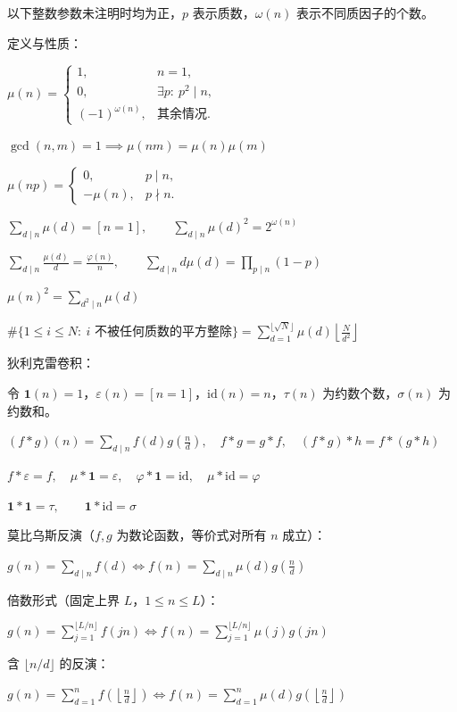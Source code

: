 以下整数参数未注明时均为正，$p$ 表示质数，$\omega(n)$ 表示不同质因子的个数。

定义与性质：\nopagebreak[4]

$\mu(n)=\begin{cases}1,&n=1,\\0,&\exists p:\ p^2\mid n,\\(-1)^{\omega(n)},&\text{其余情况}.\end{cases}$

$\gcd(n,m)=1\implies\mu(nm)=\mu(n)\mu(m)$

$\mu(np)=\begin{cases}0,&p\mid n,\\-\mu(n),&p\nmid n.\end{cases}$

$\displaystyle\sum_{d\mid n}\mu(d)=[n=1],\qquad\sum_{d\mid n}\mu(d)^2=2^{\omega(n)}$

$\displaystyle\sum_{d\mid n}\frac{\mu(d)}d=\frac{\varphi(n)}n,\qquad\sum_{d\mid n}d\mu(d)=\prod_{p\mid n}(1-p)$

$\mu(n)^2=\displaystyle\sum_{d^2\mid n}\mu(d)$

$\#\{1\le i\le N:\ i\text{ 不被任何质数的平方整除}\}=\displaystyle\sum_{d=1}^{\lfloor\sqrt N\rfloor}\mu(d)\left\lfloor\frac{N}{d^2}\right\rfloor$

狄利克雷卷积：\nopagebreak[4]

令 $\boldsymbol1(n)=1$，$\varepsilon(n)=[n=1]$，$\mathrm{id}(n)=n$，$\tau(n)$ 为约数个数，$\sigma(n)$ 为约数和。\nopagebreak[4]

$(f*g)(n)=\displaystyle\sum_{d\mid n}f(d)g\left(\frac nd\right),\quad f*g=g*f,\quad(f*g)*h=f*(g*h)$

$f*\varepsilon=f,\quad\mu*\boldsymbol1=\varepsilon,\quad\varphi*\boldsymbol1=\mathrm{id},\quad\mu*\mathrm{id}=\varphi$

$\boldsymbol1*\boldsymbol1=\tau,\qquad\boldsymbol1*\mathrm{id}=\sigma$

莫比乌斯反演（$f,g$ 为数论函数，等价式对所有 $n$ 成立）：\nopagebreak[4]

$g(n)=\displaystyle\sum_{d\mid n}f(d)\iff f(n)=\sum_{d\mid n}\mu(d)g\left(\frac nd\right)$

倍数形式（固定上界 $L$，$1\le n\le L$）：\nopagebreak[4]

$g(n)=\displaystyle\sum_{j=1}^{\lfloor L/n\rfloor}f(jn)\iff f(n)=\sum_{j=1}^{\lfloor L/n\rfloor}\mu(j)g(jn)$

含 $\lfloor n/d\rfloor$ 的反演：\nopagebreak[4]

$g(n)=\displaystyle\sum_{d=1}^{n}f\left(\left\lfloor\frac nd\right\rfloor\right)\iff f(n)=\sum_{d=1}^{n}\mu(d)g\left(\left\lfloor\frac nd\right\rfloor\right)$

